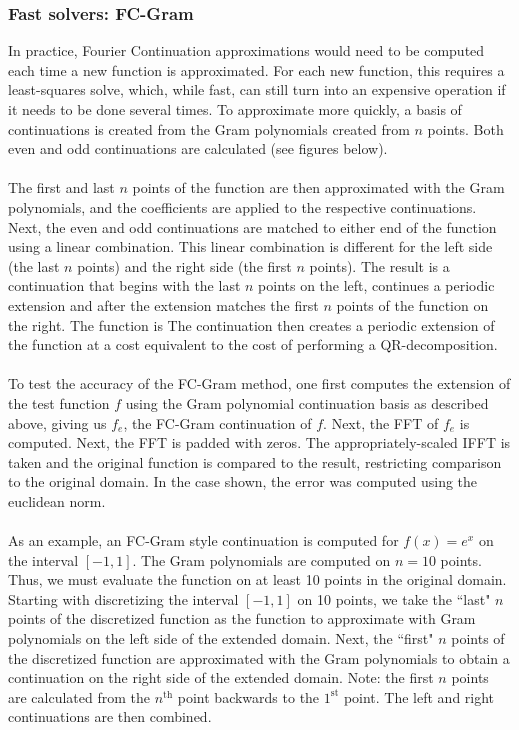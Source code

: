 \documentclass[11pt]{amsart}
\begin{document}
\subsubsection{Fast solvers: FC-Gram}
In practice, Fourier Continuation approximations would need to be computed each time a new function is approximated.  For each new function, this requires a least-squares solve, which, while fast, can still turn into an expensive operation if it needs to be done several times.  To approximate more quickly, a basis of continuations is created from the Gram polynomials created from $n$ points. Both even and odd continuations are calculated (see figures below).  
\\ \\
The first and last $n$ points of the function are then approximated with the Gram polynomials, and the coefficients are applied to the respective continuations.  Next, the even and odd continuations are matched to either end of the function using a linear combination.  This linear combination is different for the left side (the last $n$ points) and the right side (the first $n$ points).  The result is a continuation that begins with the last $n$ points on the left, continues a periodic extension and after the extension matches the first $n$ points of the function on the right. The function is 
The continuation then creates a periodic extension of the function at a cost equivalent to the cost of performing a QR-decomposition.  
\\ \\
To test the accuracy of the FC-Gram method, one first computes the extension of the test function $f$ using the Gram polynomial continuation basis as described above, giving us $f_e$, the FC-Gram continuation of $f$.  Next, the FFT of $f_e$ is computed. Next, the FFT is padded with zeros.  The appropriately-scaled IFFT is taken and the original function is compared to the result, restricting comparison to the original domain.  In the case shown, the error was computed using the euclidean norm. 
\\ \\
As an example, an FC-Gram style continuation is computed for $f(x)=e^x$ on the interval $\left[-1,1\right]$.  The Gram polynomials are computed on $n=10$ points.  Thus, we must evaluate the function on at least 10 points in the original domain.  Starting with discretizing the interval $\left[-1,1\right]$ on 10 points, we take the ``last" $n$ points of the discretized function as the function to approximate with Gram polynomials on the left side of the extended domain.  Next, the ``first" $n$ points of the discretized function are approximated with the Gram polynomials to obtain a continuation on the right side of the extended domain.  Note: the first $n$ points are calculated from the $n^{\text{th}}$ point backwards to the $1^{\text{st}}$ point.  The left and right continuations are then combined.  
\end{document}
